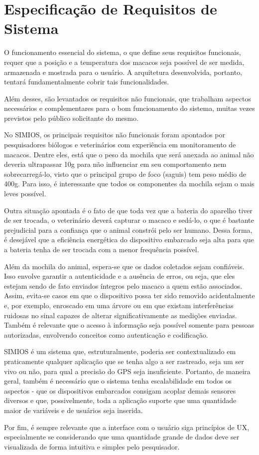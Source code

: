 \chapter{Especificação de Requisitos de Sistema}
O funcionamento essencial do sistema, o que define seus requisitos funcionais, requer que a posição e a temperatura dos macacos seja possível de ser medida, armazenada e mostrada para o usuário. A arquitetura desenvolvida, portanto, tentará fundamentalmente cobrir tais funcionalidades.

Além desses, são levantados os requisitos não funcionais, que trabalham aspectos necessários e complementares para o bom funcionamento do sistema, muitas vezes previstos pelo público solicitante do mesmo.

No SIMIOS, os principais requisitos não funcionais foram apontados por pesquisadores biólogos e veterinários com experiência em monitoramento de macacos. Dentre eles, está que o peso da mochila que será anexada ao animal não deveria ultrapassar 10g para não influenciar em seu comportamento nem sobrecarregá-lo, visto que o principal grupo de foco (saguis) tem peso médio de 400g. Para isso, é interessante que todos os componentes da mochila sejam o mais leves possível.

Outra situação apontada é o fato de que toda vez que a bateria do aparelho tiver de ser trocada, o veterinário deverá capturar o macaco e sedá-lo, o que é bastante prejudicial para a confiança que o animal constrói pelo ser humano. Dessa forma, é desejável que a eficiência energética do dispositivo embarcado seja alta para que a bateria tenha de ser trocada com a menor frequência possível.

Além da mochila do animal, espera-se que os dados coletados sejam confiáveis. Isso envolve garantir a autenticidade e a ausência de erros, ou seja, que eles estejam sendo de fato enviados íntegros pelo macaco a quem estão associados. Assim, evita-se casos em que o dispositivo possa ter sido removido acidentalmente e, por exemplo, enroscado em uma árvore ou em que existam interferências ruidosas no sinal capazes de alterar significativamente as medições enviadas. Também é relevante que o acesso à informação seja possível somente para pessoas autorizadas, envolvendo conceitos como autenticação e codificação.

SIMIOS é um sistema que, estruturalmente, poderia ser contextualizado em praticamente qualquer aplicação que se tenha algo a ser rastreado, seja um ser vivo ou não, para qual a precisão do GPS seja insuficiente. Portanto, de maneira geral, também é necessário que o sistema tenha escalabilidade em todos os aspectos - que os dispositivos embarcados consigam acoplar demais sensores diversos e que, possivelmente, toda a aplicação suporte que uma quantidade maior de variáveis e de usuários seja inserida.

Por fim, é sempre relevante que a interface com o usuário siga princípios de UX, especialmente se considerando que uma quantidade grande de dados deve ser visualizada de forma intuitiva e simples pelo pesquisador.
